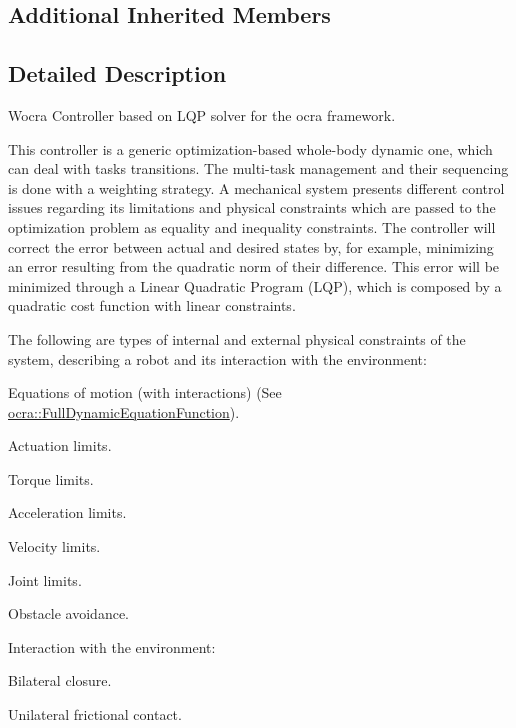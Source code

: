 \subsection*{Additional Inherited Members}


\subsection{Detailed Description}
Wocra Controller based on L\+QP solver for the ocra framework. 

This controller is a generic optimization-\/based whole-\/body dynamic one, which can deal with tasks transitions. The multi-\/task management and their sequencing is done with a weighting strategy. A mechanical system presents different control issues regarding its limitations and physical constraints which are passed to the optimization problem as equality and inequality constraints. The controller will correct the error between actual and desired states by, for example, minimizing an error resulting from the quadratic norm of their difference. This error will be minimized through a Linear Quadratic Program (L\+QP), which is composed by a quadratic cost function with linear constraints.

The following are types of internal and external physical constraints of the system, describing a robot and its interaction with the environment\+:


\begin{DoxyItemize}
\item Equations of motion (with interactions) (See \hyperlink{classocra_1_1FullDynamicEquationFunction}{ocra\+::\+Full\+Dynamic\+Equation\+Function}).
\item Actuation limits.
\begin{DoxyItemize}
\item Torque limits.
\item Acceleration limits.
\item Velocity limits.
\item Joint limits.
\end{DoxyItemize}
\item Obstacle avoidance.
\item Interaction with the environment\+:
\begin{DoxyItemize}
\item Bilateral closure.
\item Unilateral frictional contact.
\end{DoxyItemize}
\end{DoxyItemize}

